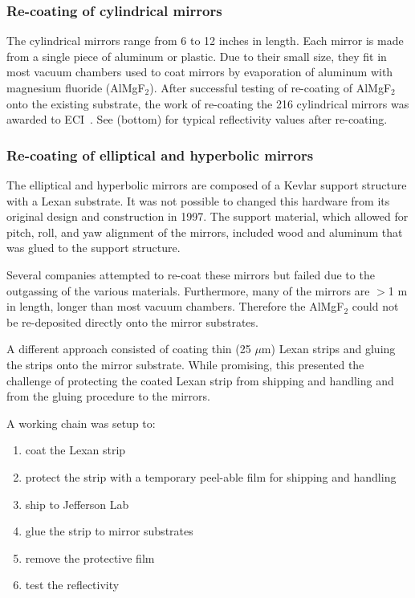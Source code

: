 \subsubsection{Re-coating of cylindrical mirrors}

The cylindrical mirrors range from 6 to 12 inches in length. Each mirror is made from a single piece of aluminum or plastic.
Due to their small size, they fit in most vacuum chambers used to coat mirrors by evaporation of aluminum with magnesium fluoride
(AlMgF$_2$). After successful testing of re-coating of AlMgF$_2$ onto the existing substrate, the work of re-coating the 216 cylindrical mirrors
was awarded to ECI~\cite{ECI}. See  (bottom) for typical reflectivity values after re-coating.

\subsubsection{Re-coating of elliptical and hyperbolic mirrors}

The elliptical and hyperbolic mirrors are composed of a Kevlar support structure with a Lexan substrate.
It was not possible to changed this hardware from its original design and construction in 1997.
The support material, which allowed for pitch, roll, and yaw alignment of the mirrors, included
wood and aluminum that was glued to the support structure.

Several companies attempted to re-coat these mirrors but failed due to the outgassing of the various materials.
Furthermore, many of the mirrors are $>$1 m in length, longer than most vacuum chambers.
Therefore the AlMgF$_2$ could not be re-deposited directly onto the mirror substrates.

A different approach consisted of coating thin (25 $\mu$m) Lexan strips and gluing the strips onto the mirror substrate.
While promising, this presented the challenge of protecting the coated Lexan strip from shipping and handling and
from the gluing procedure to the mirrors.

A working chain was setup to:

\begin{enumerate}
	\item coat the Lexan strip
	\item protect the strip with a temporary peel-able film for shipping and handling
	\item ship to Jefferson Lab
	\item glue the strip to mirror substrates
	\item remove the protective film
	\item test the reflectivity
\end{enumerate}

